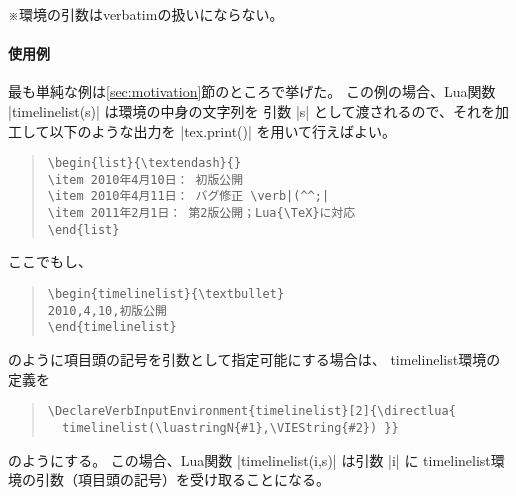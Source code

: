 \documentclass[a4paper]{ltjsarticle}
\newcommand{\Pkg}[1]{\textsf{#1}}
\newcommand{\Meta}[1]{$\langle$\mbox{}#1\mbox{}$\rangle$}
\newcommand{\Note}{\par\noindent ※}
\newcommand{\Means}{~：\quad}
\begin{document}

\Note 環境の引数はverbatimの扱いにならない。

\paragraph{使用例}
最も単純な例は\ref{sec:motivation}節のところで挙げた。
この例の場合、Lua関数 |timelinelist(s)| は環境の中身の文字列を
引数 |s| として渡されるので、それを加工して以下のような出力を
|tex.print()| を用いて行えばよい。
\begin{quote}\small\begin{verbatim}
\begin{list}{\textendash}{}
\item 2010年4月10日： 初版公開
\item 2010年4月11日： バグ修正 \verb|(^^;|
\item 2011年2月1日： 第2版公開；Lua{\TeX}に対応
\end{list}
\end{verbatim}\end{quote}

ここでもし、
\begin{quote}\small\begin{verbatim}
\begin{timelinelist}{\textbullet}
2010,4,10,初版公開
\end{timelinelist}
\end{verbatim}\end{quote}
のように項目頭の記号を引数として指定可能にする場合は、
timelinelist環境の定義を
\begin{quote}\small\begin{verbatim}
\DeclareVerbInputEnvironment{timelinelist}[2]{\directlua{
  timelinelist(\luastringN{#1},\VIEString{#2}) }}
\end{verbatim}\end{quote}
のようにする。
この場合、Lua関数 |timelinelist(i,s)| は引数 |i| に
timelinelist環境の引数（項目頭の記号）を受け取ることになる。
\end{document}
